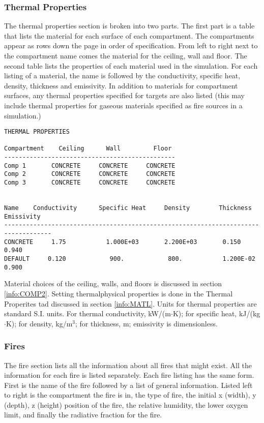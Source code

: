 \subsubsection{Thermal Properties}

The thermal properties section is broken into two parts.  The first part is a table that lists the material for each surface of each compartment.  The compartments appear as rows down the page in order of specification.  From left to right next to the compartment name comes the material for the ceiling, wall and floor.  The second table lists the properties of each material used in the simulation. For each listing of a material, the name is followed by the conductivity, specific heat, density, thickness and emissivity. In addition to materials for compartment surfaces, any thermal properties specified for targets are also listed (this may include thermal properties for gaseous materials specified as fire sources in a simulation.)

\begin{lstlisting}[basicstyle=\tiny]
THERMAL PROPERTIES

Compartment    Ceiling      Wall         Floor
-----------------------------------------------
Comp 1       CONCRETE     CONCRETE     CONCRETE
Comp 2       CONCRETE     CONCRETE     CONCRETE
Comp 3       CONCRETE     CONCRETE     CONCRETE


Name    Conductivity      Specific Heat     Density        Thickness     Emissivity
-----------------------------------------------------------------------------------
CONCRETE     1.75           1.000E+03       2.200E+03       0.150           0.940
DEFAULT     0.120            900.            800.           1.200E-02       0.900
\end{lstlisting}

Material choices of the ceiling, walls, and floors is discussed in section \ref{info:COMP2}. Setting thermalphysical properties is done in the Thermal Properites tad discussed in section \ref{info:MATL}. Units for thermal properties are standard S.I. units.  For thermal conductivity,  kW/(m$\cdot$K); for specific heat,  kJ/(kg$\cdot$K); for density, kg/m$^3$; for thickness, m; emissivity is dimensionless.


\subsubsection{Fires}

The fire section lists all the information about all fires that might exist.  All the information for each fire is listed separately.   Each fire listing has the same form.  First is the name of the fire followed by a list of general information.  Listed left to right is the compartment the fire is in, the type of fire, the initial x (width), y (depth), z (height) position of the fire, the relative humidity, the lower oxygen limit, and finally the radiative fraction for the fire.

